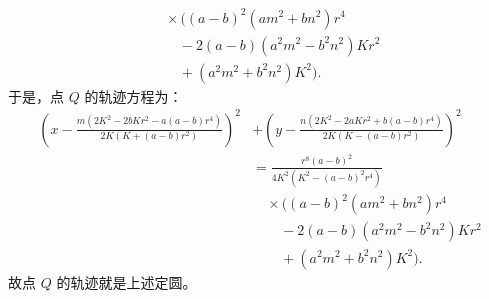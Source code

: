 \begin{solution}
\[\begin{aligned}
&\quad \times \Big((a - b)^2(am^2 + bn^2)r^4 \\
&\qquad - 2(a - b)(a^2m^2 - b^2n^2)Kr^2 \\
&\qquad + (a^2m^2 + b^2n^2)K^2\Big).
\end{aligned}
\]
于是，点 $Q$ 的轨迹方程为：
\[
\begin{aligned}
\left( x - \frac{m\left(2K^2 - 2bKr^2 - a(a - b)r^4\right)}{2K\left(K + (a - b)r^2\right)} \right)^2
&+ \left( y - \frac{n\left(2K^2 - 2aKr^2 + b(a - b)r^4\right)}{2K\left(K - (a - b)r^2\right)} \right)^2 \\
&= \frac{r^8(a - b)^2}{4K^2\left(K^2 - (a - b)^2r^4\right)} \\
&\quad \times \Big((a - b)^2(am^2 + bn^2)r^4 \\
&\qquad - 2(a - b)(a^2m^2 - b^2n^2)Kr^2 \\
&\qquad + (a^2m^2 + b^2n^2)K^2\Big).
\end{aligned}
\]
故点 $Q$ 的轨迹就是上述定圆。
\end{solution}


